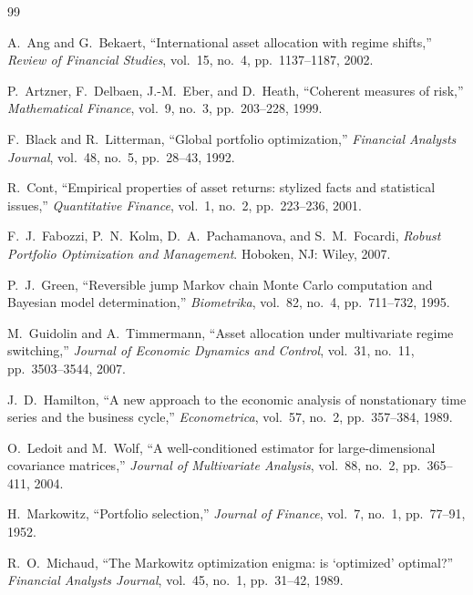\begin{thebibliography}{99}

 A.\ Ang and G.\ Bekaert, ``International asset allocation with regime shifts,'' \textit{Review of Financial Studies}, vol.\ 15, no.\ 4, pp.\ 1137--1187, 2002.

 P.\ Artzner, F.\ Delbaen, J.-M.\ Eber, and D.\ Heath, ``Coherent measures of risk,'' \textit{Mathematical Finance}, vol.\ 9, no.\ 3, pp.\ 203--228, 1999.

 F.\ Black and R.\ Litterman, ``Global portfolio optimization,'' \textit{Financial Analysts Journal}, vol.\ 48, no.\ 5, pp.\ 28--43, 1992.

 R.\ Cont, ``Empirical properties of asset returns: stylized facts and statistical issues,'' \textit{Quantitative Finance}, vol.\ 1, no.\ 2, pp.\ 223--236, 2001.

 F.\ J.\ Fabozzi, P.\ N.\ Kolm, D.\ A.\ Pachamanova, and S.\ M.\ Focardi, \textit{Robust Portfolio Optimization and Management}. Hoboken, NJ: Wiley, 2007.

 P.\ J.\ Green, ``Reversible jump Markov chain Monte Carlo computation and Bayesian model determination,'' \textit{Biometrika}, vol.\ 82, no.\ 4, pp.\ 711--732, 1995.

 M.\ Guidolin and A.\ Timmermann, ``Asset allocation under multivariate regime switching,'' \textit{Journal of Economic Dynamics and Control}, vol.\ 31, no.\ 11, pp.\ 3503--3544, 2007.

 J.\ D.\ Hamilton, ``A new approach to the economic analysis of nonstationary time series and the business cycle,'' \textit{Econometrica}, vol.\ 57, no.\ 2, pp.\ 357--384, 1989.

 O.\ Ledoit and M.\ Wolf, ``A well-conditioned estimator for large-dimensional covariance matrices,'' \textit{Journal of Multivariate Analysis}, vol.\ 88, no.\ 2, pp.\ 365--411, 2004.

 H.\ Markowitz, ``Portfolio selection,'' \textit{Journal of Finance}, vol.\ 7, no.\ 1, pp.\ 77--91, 1952.

 R.\ O.\ Michaud, ``The Markowitz optimization enigma: is `optimized' optimal?'' \textit{Financial Analysts Journal}, vol.\ 45, no.\ 1, pp.\ 31--42, 1989.


\end{thebibliography}
